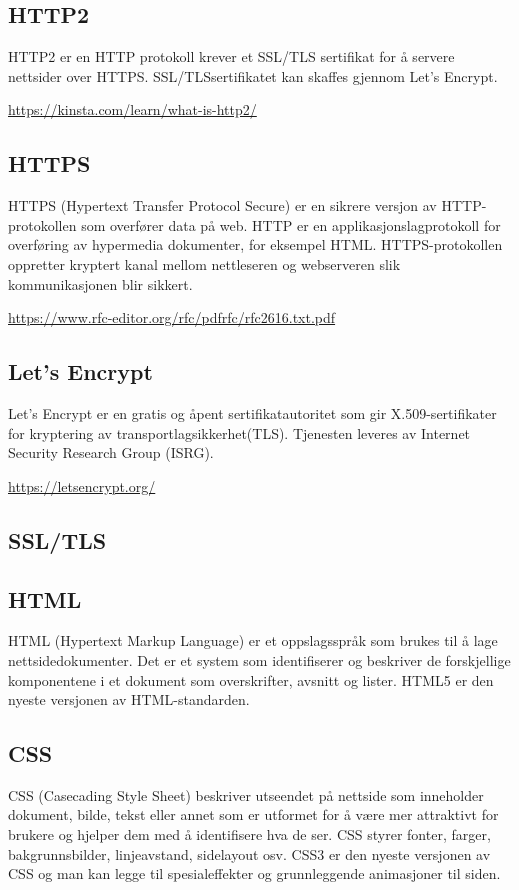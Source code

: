 \subsection{HTTP2}
HTTP2 er en HTTP protokoll krever et SSL/TLS sertifikat for å servere nettsider over HTTPS. SSL/TLSsertifikatet kan skaffes gjennom Let’s Encrypt.  

\url{https://kinsta.com/learn/what-is-http2/}

\subsection{HTTPS}
HTTPS (Hypertext Transfer Protocol Secure) er en sikrere versjon av HTTP-protokollen som overfører data på web. HTTP er en applikasjonslagprotokoll for overføring av hypermedia dokumenter, for eksempel HTML. HTTPS-protokollen oppretter kryptert kanal mellom nettleseren og webserveren slik  kommunikasjonen blir sikkert. 

\url{https://www.rfc-editor.org/rfc/pdfrfc/rfc2616.txt.pdf}

\subsection{Let’s Encrypt}
Let’s Encrypt er en gratis og åpent sertifikatautoritet som gir X.509-sertifikater for kryptering av transportlagsikkerhet(TLS). Tjenesten leveres av Internet Security Research Group (ISRG).

\url{https://letsencrypt.org/}

\subsection{SSL/TLS}

\subsection{HTML}
HTML (Hypertext Markup Language) er et oppslagsspråk som brukes til å lage nettsidedokumenter. Det er et system som identifiserer og beskriver de forskjellige komponentene i et dokument som overskrifter, avsnitt og lister. HTML5 er den nyeste versjonen av HTML-standarden.

\subsection{CSS}
CSS (Casecading Style Sheet) beskriver utseendet på nettside som inneholder dokument, bilde, tekst eller annet som er utformet for å være mer attraktivt for brukere og hjelper dem med å identifisere hva de ser. CSS styrer fonter, farger, bakgrunnsbilder, linjeavstand, sidelayout osv. CSS3 er den nyeste versjonen av CSS og man kan legge til spesialeffekter og grunnleggende animasjoner til siden.

